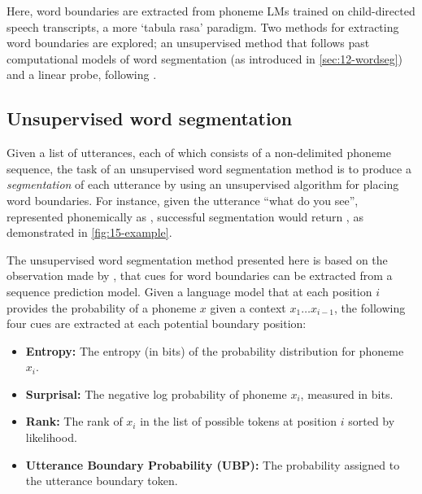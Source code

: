 Here, word boundaries are extracted from phoneme LMs trained on child-directed speech transcripts, a more `tabula rasa' paradigm. Two methods for extracting word boundaries are explored; an unsupervised method that follows past computational models of word segmentation (as introduced in \cref{sec:12-wordseg}) and a linear probe, following \citet{hahn-baroni-2019-tabula}.

\subsection{Unsupervised word segmentation}\label{sec:15-wordsegunsupervised}

Given a list of utterances, each of which consists of a non-delimited phoneme sequence, the task of an unsupervised word segmentation method is to produce a \emph{segmentation} of each utterance by using an unsupervised algorithm for placing word boundaries. For instance, given the utterance ``what do you see'', represented phonemically as , successful segmentation would return , as demonstrated in \cref{fig:15-example}.

The unsupervised word segmentation method presented here is based on the observation made by \citet{elman1990finding}, that cues for word boundaries can be extracted from a sequence prediction model. Given a language model that at each position $i$ provides the probability of a phoneme $x$ given a context $x_1\ldots x_{i-1}$, the following four cues are extracted at each potential boundary position:

\begin{itemize}[leftmargin=*]
    \item \textbf{Entropy:} The entropy (in bits) of the probability distribution for phoneme $x_i$.%
    \item \textbf{Surprisal:} The negative log probability of phoneme $x_i$, measured in bits. %
    \item \textbf{Rank:} The rank of $x_i$ in the list of possible tokens at position $i$ sorted by likelihood.
    \item \textbf{Utterance Boundary Probability (UBP):} The probability assigned to the utterance boundary token.
\end{itemize}

